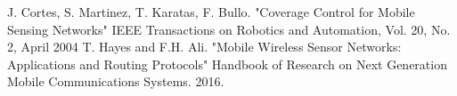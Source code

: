 \documentclass[a4paper,11pt,oneside]{book}
\begin{document}
	
	\begin{thebibliography}{9}             %
		
		
		
		 J. Cortes, S. Martinez, T. Karatas, F. Bullo. "Coverage Control for Mobile Sensing Networks"
		IEEE Transactions on Robotics and Automation, Vol. 20, No. 2, April 2004
		 T. Hayes and F.H. Ali. "Mobile Wireless Sensor Networks: Applications and Routing Protocols" Handbook of Research on Next Generation Mobile Communications Systems. 2016.
		
	\end{thebibliography}
	
	
\end{document}
